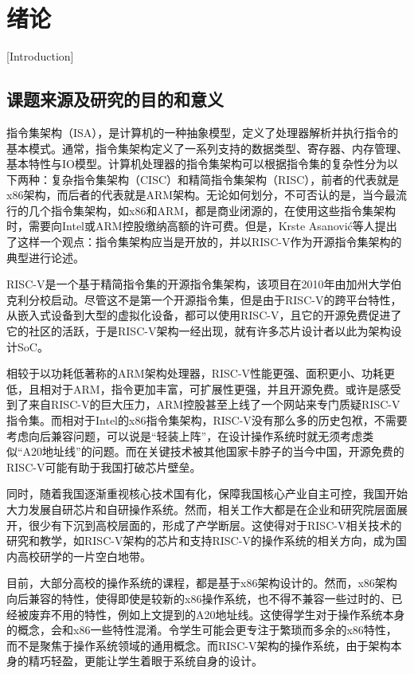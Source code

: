 
\chapter{绪论}[Introduction]

\section{课题来源及研究的目的和意义}

指令集架构（ISA），是计算机的一种抽象模型，定义了处理器解析并执行指令的基本模式。通常，指令集架构定义了一系列支持的数据类型、寄存器、内存管理、基本特性与IO模型。计算机处理器的指令集架构可以根据指令集的复杂性分为以下两种：复杂指令集架构（CISC）和精简指令集架构（RISC），前者的代表就是x86架构，而后者的代表就是ARM架构\cite{DBLP:conf/hpca/BlemMS13}。无论如何划分，不可否认的是，当今最流行的几个指令集架构，如x86和ARM，都是商业闭源的，在使用这些指令集架构时，需要向Intel或ARM控股缴纳高额的许可费。但是，Krste Asanović等人提出了这样一个观点：指令集架构应当是开放的\cite{Asanović:EECS-2014-146}，并以RISC-V作为开源指令集架构的典型进行论述。

RISC-V是一个基于精简指令集的开源指令集架构，该项目在2010年由加州大学伯克利分校启动。尽管这不是第一个开源指令集，但是由于RISC-V的跨平台特性，从嵌入式设备到大型的虚拟化设备，都可以使用RISC-V，且它的开源免费促进了它的社区的活跃，于是RISC-V架构一经出现，就有许多芯片设计者以此为架构设计SoC\cite{DBLP:conf/asap/FlamandR0LPRB18}\cite{DBLP:journals/jssc/KellerCZKPLBBCD17}\cite{7436635}。

相较于以功耗低著称的ARM架构处理器，RISC-V性能更强、面积更小、功耗更低\cite{A45nm1.3GHz}，且相对于ARM，指令更加丰富，可扩展性更强，并且开源免费。或许是感受到了来自RISC-V的巨大压力，ARM控股甚至上线了一个网站来专门质疑RISC-V指令集。而相对于Intel的x86指令集架构，RISC-V没有那么多的历史包袱，不需要考虑向后兼容问题\cite{DBLP:conf/hpca/BlemMS13}，可以说是“轻装上阵”，在设计操作系统时就无须考虑类似“A20地址线”的问题。而在关键技术被其他国家卡脖子的当今中国，开源免费的RISC-V可能有助于我国打破芯片壁垒。

同时，随着我国逐渐重视核心技术国有化，保障我国核心产业自主可控，我国开始大力发展自研芯片和自研操作系统\cite{王莹2019中国工程院院士}。然而，相关工作大都是在企业和研究院层面展开，很少有下沉到高校层面的\cite{程知2020基于}\cite{张军2020基于}，形成了产学断层。这使得对于RISC-V相关技术的研究和教学，如RISC-V架构的芯片和支持RISC-V的操作系统的相关方向，成为国内高校研学的一片空白地带。

目前，大部分高校的操作系统的课程，都是基于x86架构设计的。然而，x86架构向后兼容的特性，使得即使是较新的x86操作系统，也不得不兼容一些过时的、已经被废弃不用的特性，例如上文提到的A20地址线。这使得学生对于操作系统本身的概念，会和x86一些特性混淆。令学生可能会更专注于繁琐而多余的x86特性，而不是聚焦于操作系统领域的通用概念。而RISC-V架构的操作系统，由于架构本身的精巧轻盈，更能让学生着眼于系统自身的设计\cite{greengard2020will}。

